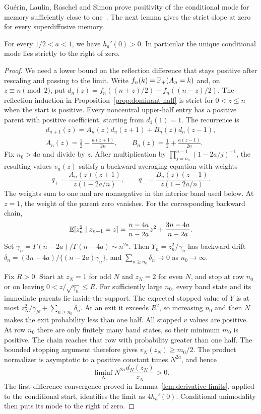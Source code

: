 Gu\'erin, Laulin, Raschel and Simon prove positivity of the conditional
mode for memory sufficiently close to one~\cite[Remark~2.1(a)]{glrs2025}.
The next lemma gives the strict slope at zero for every
superdiffusive memory.

\begin{lemma}\label{lem:positive-conditional-mode}
For every $1/2<a<1$, we have $h_a'(0)>0$. In particular the unique
conditional mode lies strictly to the right of zero.
\end{lemma}

\begin{proof}
We need a lower bound on the reflection difference that stays
positive after rescaling and passing to the limit. Write $f_n(k)=\mathbb{P}_+(A_n=k)$ and, on
$z\equiv n\pmod2$, put
$d_n(z)=f_n((n+z)/2)-f_n((n-z)/2)$.
The reflection induction in Proposition~\ref{prop:dominant-half}
is strict for $0<z\le n$ when the start is positive. Every noncentral
upper-half entry has a positive parent with positive coefficient,
starting from $d_1(1)=1$.
The recurrence is
\begin{gather*}
 d_{n+1}(z)=A_n(z)d_n(z+1)+B_n(z)d_n(z-1),\\
 A_n(z)=\frac12-\frac{a(z+1)}{2n},\qquad
 B_n(z)=\frac12+\frac{a(z-1)}{2n}.
\end{gather*}
Fix $n_0>4a$ and divide by $z$. After multiplication by
$\prod_{j=n_0}^{n-1}(1-2a/j)^{-1}$, the resulting values $v_n(z)$
satisfy a backward averaging equation with weights
\[
 q_+=\frac{A_n(z)(z+1)}{z(1-2a/n)},\qquad
 q_-=\frac{B_n(z)(z-1)}{z(1-2a/n)}.
\]
The weights sum to one and are nonnegative in the interior band
used below. At $z=1$, the weight of the parent zero vanishes.
For the corresponding backward chain,
\[
 \mathbb{E}[z_n^2\mid z_{n+1}=z]
 =\frac{n-4a}{n-2a}z^2+\frac{3n-4a}{n-2a}.
\]
Set $\gamma_n=\Gamma(n-2a)/\Gamma(n-4a)\sim n^{2a}$.
Then $Y_n=z_n^2/\gamma_n$ has backward drift
$\delta_n=(3n-4a)/\{(n-2a)\gamma_n\}$, and
$\sum_{n\ge n_0}\delta_n\to0$ as $n_0\to\infty$.

Fix $R>0$. Start at $z_N=1$ for odd $N$ and $z_N=2$ for even $N$,
and stop at row $n_0$ or on leaving $0<z/\sqrt{\gamma_n}\le R$.
For sufficiently large $n_0$, every band state and its immediate
parents lie inside the support. The expected stopped value of $Y$
is at most $z_N^2/\gamma_N+\sum_{n\ge n_0}\delta_n$.
At an exit it exceeds $R^2$, so increasing $n_0$ and then $N$
makes the exit probability less than one half.
All stopped $v$ values are positive. At row $n_0$ there are only
finitely many band states, so their minimum $m_0$ is positive.
The chain reaches that row with probability greater than one half.
The bounded stopping argument therefore gives $v_N(z_N)\ge m_0/2$.
The product normalizer is asymptotic to a positive constant times
$N^{2a}$, and hence
\[
 \liminf_N N^{2a}\frac{d_N(z_N)}{z_N}>0.
\]
The first-difference convergence proved in
Lemma~\ref{lem:derivative-limits}, applied to the conditional start,
identifies the limit as $4h_a'(0)$. Conditional unimodality
then puts its mode to the right of zero.
\end{proof}
